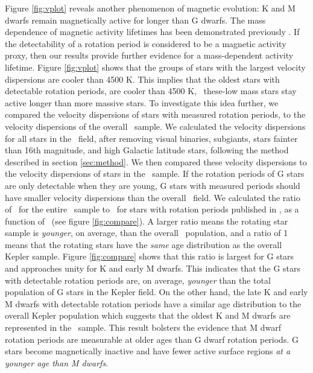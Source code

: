 Figure \ref{fig:vplot} reveals another phenomenon of magnetic evolution:
K and M dwarfs remain magnetically active for longer than G dwarfs.
The mass dependence of magnetic activity lifetimes has been demonstrated
previously \citep[\eg][]{west2008, newton2017, kiman2019}.
If the detectability of a rotation period is considered to be a magnetic
activity proxy, then our results provide further evidence for a mass-dependent
activity lifetime.
Figure \ref{fig:vplot} shows that the groups of stars with the largest
velocity dispersions are cooler than 4500 K.
This implies that the oldest stars with detectable rotation periods, are
cooler than 4500 K, \ie\ these-low mass stars stay active longer than more
massive stars.
To investigate this idea further, we compared the velocity dispersions of
stars with measured rotation periods, to the velocity dispersions of the
overall \kepler\ sample.
We calculated the velocity dispersions for all stars in the \kepler\ field,
after removing visual binaries, subgiants, stars fainter than 16th magnitude,
and high Galactic latitude stars, following the method described in section
\ref{sec:method}.
We then compared these velocity dispersions to the velocity dispersions of
stars in the \mct\ sample.
If the rotation periods of G stars are only detectable when they are young,
G stars with measured periods should have smaller velocity dispersions than
the overall \kepler\ field.
We calculated the ratio of \sigmavb\ for the entire \Kepler\ sample to
\sigmavb\ for stars with rotation periods published in \mct, as a function of
\teff\ (see figure \ref{fig:compare}).
A larger ratio means the rotating star sample is {\it younger}, on average,
than the overall \Kepler\ population, and a ratio of 1 means that the rotating
stars have the {\it same} age distribution as the overall Kepler sample.
Figure \ref{fig:compare} shows that this ratio is largest for G stars and
approaches unity for K and early M dwarfs.
This indicates that the G stars with detectable rotation periods are, on
average, {\it younger} than the total population of G stars in the Kepler
field.
On the other hand, the late K and early M dwarfs with detectable rotation
periods have a similar age distribution to the overall Kepler population which
suggests that the oldest K and M dwarfs are represented in the \mct\ sample.
This result bolsters the evidence that M dwarf rotation periods are measurable
at older ages than G dwarf rotation periods.
G stars become magnetically inactive and have fewer active surface regions
{\it at a younger age than M dwarfs}.

